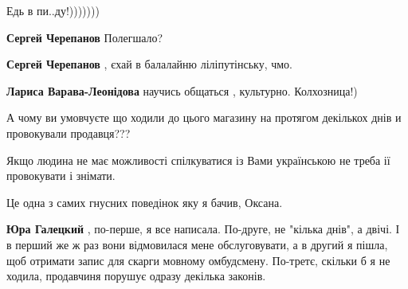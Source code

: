 \begin{itemize}
Едь в пи..ду!)))))))

\begin{itemize}
 
\textbf{Сергей Черепанов} Полегшало?

 
\textbf{Сергей Черепанов} , єхай в балалайню ліліпутінську, чмо.

 
\textbf{Лариса Варава-Леонідова} научись общаться , культурно. Колхозница!)
\end{itemize}


А чому ви умовчуєте що ходили до цього магазину на протягом декількох днів и
провокували продавця???

Якщо людина не має можливості спілкуватися із Вами українською не треба ії
провокувати і знімати.

Це одна з самих гнусних поведінок яку я бачив, Оксана.

\begin{itemize}
 
\textbf{Юра Галецкий} , по-перше, я все написала. По-друге, не "кілька днів", а
двічі. І в перший же ж раз вони відмовилася мене обслуговувати, а в другий я
пішла, щоб отримати запис для скарги мовному омбудсмену. По-третє, скільки б я
не ходила, продавчиня порушує одразу декілька законів.


\end{itemize}
\end{itemize}
